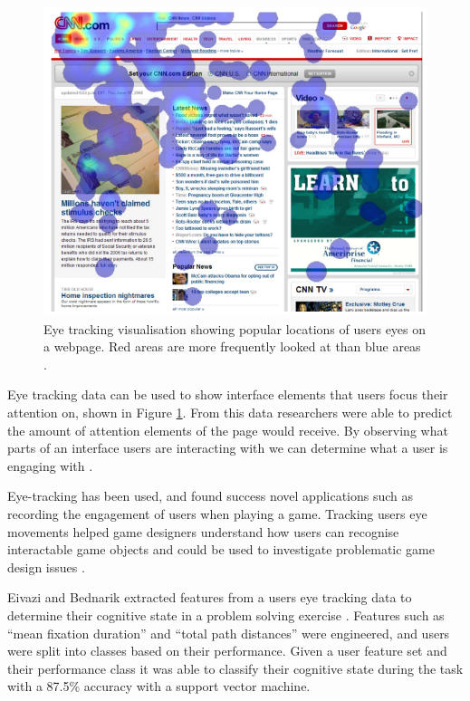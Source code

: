 \documentclass{article}
\begin{document}
\begin{figure}[ht!]
    \centering
    \centerline{
        \includegraphics[scale=0.6]{Images/EyeHeatmap.PNG}
    }
    \caption{Eye tracking visualisation showing popular locations of users eyes on a webpage. Red areas are more frequently looked at than blue areas \cite{buscher2009you}.}
    \label{fig:eyetrack}
\end{figure}

Eye tracking data can be used to show interface elements that users focus their attention on, shown in Figure \ref{fig:eyetrack}. 
From this data researchers were able to predict the amount of attention elements of the page would receive.
By observing what parts of an interface users are interacting with we can determine what a user is engaging with \cite{buscher2009you}.

Eye-tracking has been used, and found success novel applications such as recording the engagement of users when playing a game. 
Tracking users eye movements helped game designers understand how users can recognise interactable game objects and could be used to investigate problematic game design issues \cite{renshaw2009towards}.

Eivazi and Bednarik extracted features from a users eye tracking data to determine their cognitive state in a problem solving exercise \cite{eivazi2011predicting}.
Features such as ``mean fixation duration'' and ``total path distances'' were engineered, and users were split into classes based on their performance. 
Given a user feature set and their performance class it was able to classify their cognitive state during the task with a 87.5\% accuracy with a support vector machine.
\end{document}
